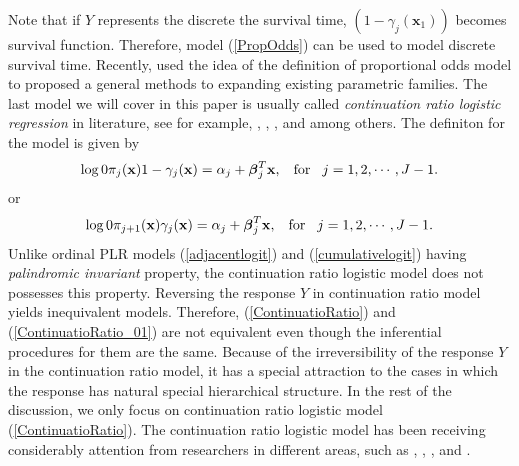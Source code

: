 \documentclass[11pt]{article}
\theoremstyle{plain}
\theoremstyle{definition}
\theoremstyle{remark}
\theoremstyle{definition}
\begin{document}
Note that if $Y$ represents the discrete the survival time, $(1-\gamma_j(\mathbf{x}_1))$ becomes survival function. Therefore, model (\ref{PropOdds}) can be used to model discrete survival time. Recently, \cite{Martshall-Olkin-1997} used the idea of the definition of proportional odds model to proposed a general methods to expanding existing parametric families. The last model we will cover in this paper is usually called {\em continuation ratio logistic regression} in literature, see for example, \cite{Fienberg-book-1978}, \cite{MCCULLAGH-OrdinalReg-Discussion-1980}, \cite{Aggresti-CDA-2002}, and among others. The definiton for the model is given by
\begin{equation}
\log \frac{\pi_j(\mathbf{x})}{1-\gamma_j(\mathbf{x})}=\alpha_j +  {\mbox{\boldmath $\beta$}}_j^{T}\mathbf{x}, \hspace{3mm}\mbox{for}\hspace{3mm} j =1, 2, \cdots, J-1. \label{ContinuatioRatio}
\end{equation}
or
\begin{equation}
\log \frac{\pi_{j+1}(\mathbf{x})}{\gamma_{j}(\mathbf{x})}=\alpha_j +  {\mbox{\boldmath $\beta$}}_j^{T}\mathbf{x}, \hspace{3mm}\mbox{for}\hspace{3mm} j =1, 2, \cdots, J-1. \label{ContinuatioRatio_01}
\end{equation}
Unlike ordinal PLR models (\ref{adjacentlogit}) and (\ref{cumulativelogit}) having {\em palindromic invariant} property, the continuation ratio logistic model does not possesses this property. Reversing the response $Y$ in continuation ratio model yields inequivalent models. Therefore, (\ref{ContinuatioRatio}) and (\ref{ContinuatioRatio_01}) are not equivalent even though the inferential procedures for them are the same. Because of the irreversibility of the response $Y$ in the continuation ratio model, it has a special attraction to the cases in which the response has natural special hierarchical structure. In the rest of the discussion, we only focus on continuation ratio logistic model (\ref{ContinuatioRatio}). The continuation ratio logistic model has been receiving considerably attention from researchers in different areas, such as \cite{Hemker-MeasurementContinuationRatio-2001}, \cite{Tutz-SeqCateReg-CSDA-1991}, \cite{Kvist-Gislason-Thyregod-2000}, \cite{Rindorf-Lewy-2001} and \cite{Cox-StatMed-1988}.
\end{document}
